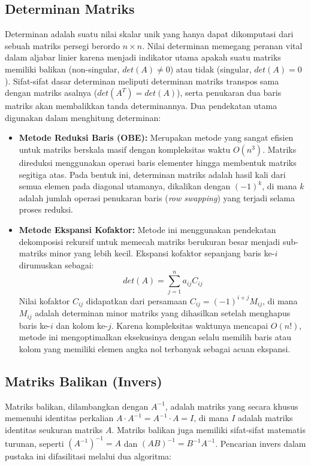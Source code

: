 \documentclass[12pt, a4paper]{article}
\begin{document}
\subsection{Determinan Matriks}
Determinan adalah suatu nilai skalar unik yang hanya dapat dikomputasi dari sebuah matriks persegi berordo $n \times n$. Nilai determinan memegang peranan vital dalam aljabar linier karena menjadi indikator utama apakah suatu matriks memiliki balikan (non-singular, $det(A) \neq 0$) atau tidak (singular, $det(A) = 0$). Sifat-sifat dasar determinan meliputi determinan matriks transpos sama dengan matriks asalnya ($det(A^T) = det(A)$), serta penukaran dua baris matriks akan membalikkan tanda determinannya. Dua pendekatan utama digunakan dalam menghitung determinan:

\begin{itemize}
    \item \textbf{Metode Reduksi Baris (OBE):} Merupakan metode yang sangat efisien untuk matriks berskala masif dengan kompleksitas waktu $O(n^3)$. Matriks direduksi menggunakan operasi baris elementer hingga membentuk matriks segitiga atas. Pada bentuk ini, determinan matriks adalah hasil kali dari semua elemen pada diagonal utamanya, dikalikan dengan $(-1)^k$, di mana $k$ adalah jumlah operasi penukaran baris (\textit{row swapping}) yang terjadi selama proses reduksi.
    \item \textbf{Metode Ekspansi Kofaktor:} Metode ini menggunakan pendekatan dekomposisi rekursif untuk memecah matriks berukuran besar menjadi sub-matriks minor yang lebih kecil. Ekspansi kofaktor sepanjang baris ke-$i$ dirumuskan sebagai:
    $$det(A) = \sum_{j=1}^n a_{ij}C_{ij}$$
    Nilai kofaktor $C_{ij}$ didapatkan dari persamaan $C_{ij} = (-1)^{i+j}M_{ij}$, di mana $M_{ij}$ adalah determinan minor matriks yang dihasilkan setelah menghapus baris ke-$i$ dan kolom ke-$j$. Karena kompleksitas waktunya mencapai $O(n!)$, metode ini mengoptimalkan eksekusinya dengan selalu memilih baris atau kolom yang memiliki elemen angka nol terbanyak sebagai acuan ekspansi.
\end{itemize}

\subsection{Matriks Balikan (Invers)}
Matriks balikan, dilambangkan dengan $A^{-1}$, adalah matriks yang secara khusus memenuhi identitas perkalian $A \cdot A^{-1} = A^{-1} \cdot A = I$, di mana $I$ adalah matriks identitas seukuran matriks $A$. Matriks balikan juga memiliki sifat-sifat matematis turunan, seperti $(A^{-1})^{-1} = A$ dan $(AB)^{-1} = B^{-1}A^{-1}$. Pencarian invers dalam pustaka ini difasilitasi melalui dua algoritma:
\end{document}
